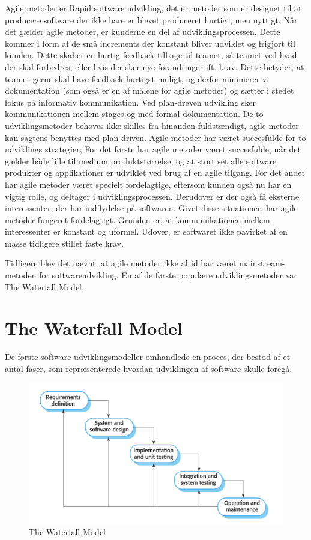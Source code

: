 Agile metoder er Rapid software udvikling, det er metoder som er designet til at producere software der ikke bare er blevet produceret hurtigt, men nyttigt\cite{Sommerville}. Når det gælder agile metoder, er kunderne en del af udviklingsprocessen. Dette kommer i form af de små increments der konstant bliver udviklet og frigjort til kunden. Dette skaber en hurtig feedback tilbage til teamet, så teamet ved hvad der skal forbedres, eller hvis der sker nye forandringer ift. krav. Dette betyder, at teamet gerne skal have feedback hurtigst muligt, og derfor minimerer vi dokumentation (som også er en af målene for agile metoder) og sætter i stedet fokus på informativ kommunikation. Ved plan-dreven udvikling sker kommunikationen mellem stages og med formal dokumentation. De to udviklingsmetoder behøves ikke skilles fra hinanden fuldstændigt, agile metoder kan sagtens benyttes med plan-driven. Agile metoder har været succesfulde for to udviklings strategier;
For det første har agile metoder været succesfulde, når det gælder både lille til medium produktstørrelse, og at stort set alle software produkter og applikationer er udviklet ved brug af en agile tilgang.
For det andet har agile metoder været specielt fordelagtige, eftersom kunden også nu har en vigtig rolle, og deltager i udviklingsprocessen. Derudover er der også få eksterne interessenter, der har indflydelse på softwaren\cite{Sommerville}. 
Givet disse situationer, har agile metoder fungeret fordelagtigt. Grunden er, at kommunikationen mellem interessenter er konstant og uformel. Udover, er softwaret ikke påvirket af en masse tidligere stillet faste krav.

Tidligere blev det nævnt, at agile metoder ikke altid har været mainstream-metoden for softwareudvikling. En af de første populære udviklingsmetoder var The Waterfall Model.

\section{The Waterfall Model}
De første software udviklingsmodeller omhandlede en proces, der bestod af et antal faser, som repræsenterede hvordan udviklingen af software skulle foregå\cite{Sommerville}. 

\begin{figure}
    \includegraphics[width=\linewidth]{figures/waterfall_model.png}
    \caption{The Waterfall Model}
    \label{fig:waterfall}
\end{figure}

